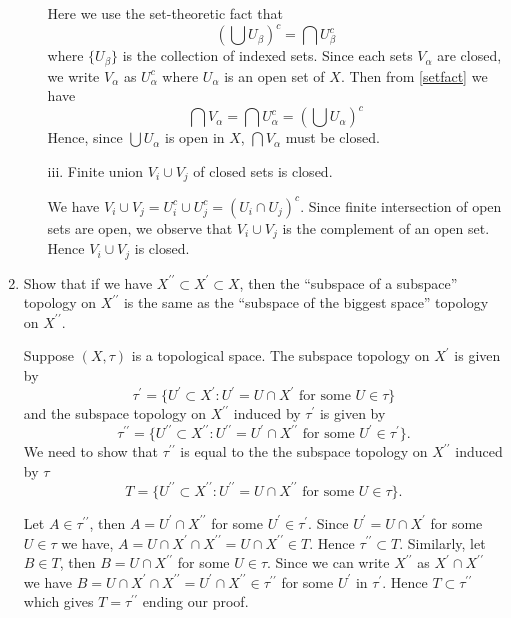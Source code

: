 \documentclass[12pt]{article}
\newcommand{\dprime}{{\prime\prime}}
\begin{document}
\begin{enumerate}
\begin{mybox}
\begin{enumerate}
      \setlength{\parskip}{2mm}
      Here we use the set-theoretic fact that
      \begin{equation}
        \left(\bigcup U_\beta\right)^c=
      \bigcap U_\beta^c \label{setfact}
      \end{equation}
      where $\{U_\beta\}$ is the collection of
      indexed sets. Since each sets $V_\alpha$
      are closed, we write $V_\alpha$ as $U_\alpha^c$
      where $U_\alpha$ is an open set of $X$.
      Then from \ref{setfact} we have
      \begin{equation}
        \bigcap V_\alpha=\bigcap U_\alpha^c=
        \left(\bigcup U_\alpha\right)^c
      \end{equation}
      Hence, since $\bigcup U_\alpha$ is open in $X$,
      $\bigcap V_\alpha$ must be closed.

      \item[iii.] Finite union $V_i\cup V_j$ of closed sets
        is closed.

        \setlength{\parskip}{3mm}
         We have $V_i\cup V_j=U_i^c\cup U_j^c=(U_i\cap U_j)
         ^c$. Since finite intersection of open sets are
         open, we observe that $V_i\cup V_j$ is the complement
         of an open set. Hence $V_i\cup V_j$ is closed.
  \end{enumerate}
\end{mybox}


\item Show that if we have
$X^{\prime\prime}\subset X^{\prime}\subset X$,
then the “subspace of a subspace” topology on
$X^{\prime\prime}$ is the same as the “subspace of the biggest space”
topology on $X^{\prime\prime}$.

\begin{mybox}
  
Suppose $(X,\tau)$ is a topological space.
The subspace topology on $X^{\prime}$ is given by
$$\tau^{\prime}=\{U^{\prime}\subset X^{\prime}:
U^\prime = U\cap X^\prime\text{ for some }U\in\tau\}$$
and the subspace topology on $X^{\prime\prime}$
induced by $\tau^\prime$ is given by
$$\tau^{\prime\prime}=\{U^{\prime\prime}\subset
X^{\prime\prime}:U^{\prime\prime} = U^\prime\cap
X^{\prime\prime}\text{ for some }U^\prime\in\tau^\prime\}.$$
We need to show that $\tau^{\prime\prime}$ is equal to the
the subspace topology on $X^{\prime\prime}$ induced by
$\tau$
$$T=\{U^{\prime\prime}\subset
X^{\prime\prime}:U^{\prime\prime} = U\cap
X^{\prime\prime}\text{ for some }U\in\tau\}.$$

Let $A\in \tau^{\prime\prime}$, then $A=U^\prime\cap
X^{\dprime}$ for some $U^\prime\in\tau^\prime$. Since
$U^\prime=U\cap X^\prime$ for some $U\in\tau$ we have,
$A=U\cap X^\prime\cap X^\dprime=U\cap X^\dprime
\in T$. Hence $\tau^\dprime\subset T$. Similarly,
let $B\in T$, then $B=U\cap X^\dprime$ for some $U\in
\tau$. Since we can write $X^\dprime$ as $X^\prime\cap
X^\dprime$ we have $B=U\cap X^\prime\cap X^\dprime=
U^\prime\cap X^\dprime\in \tau^\dprime$ for some $U^\prime
$ in $\tau^\prime$. Hence $T\subset \tau^\dprime$ which
gives $T=\tau^\dprime$ ending our proof.
\end{mybox}
  


\end{enumerate}
\end{document}
